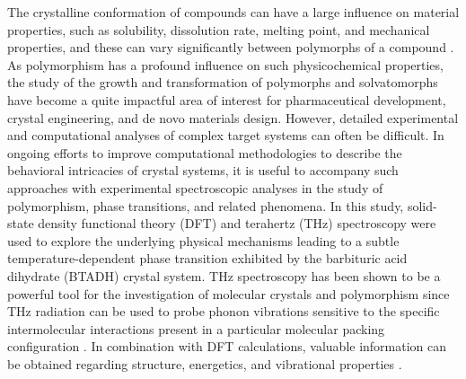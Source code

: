 The crystalline conformation of compounds can have a large influence on material properties, such as solubility, dissolution rate, melting point, and mechanical properties, and these can vary significantly between polymorphs of a compound \citep{Brittain2016,bernstein_polymorphism_2011,gentili_polymorphism_2019}. As polymorphism has a profound influence on such physicochemical properties, the study of the growth and transformation of polymorphs and solvatomorphs have become a quite impactful area of interest for pharmaceutical development, crystal engineering, and de novo materials design\citep{galindo_control_2017,maini_chemical_2015,hiremath_controlling_2005,cocca_influence_2011,lee_crystal_2011,moulton_molecules_2001,baskar_raj_pseudo-polymorphism_2003}. However, detailed experimental and computational analyses of complex target systems can often be difficult. In ongoing efforts to improve computational methodologies to describe the behavioral intricacies of crystal systems, it is useful to accompany such approaches with experimental spectroscopic analyses in the study of polymorphism, phase transitions, and related phenomena.
In this study, solid-state density functional theory (DFT) and terahertz (THz) spectroscopy were used to explore the underlying physical mechanisms leading to a subtle temperature-dependent phase transition exhibited by the barbituric acid dihydrate (BTADH) crystal system. THz spectroscopy has been shown to be a powerful tool for the investigation of molecular crystals and polymorphism since THz radiation can be used to probe phonon vibrations sensitive to the specific intermolecular interactions present in a particular molecular packing configuration \citep{ruggiero_resolving_2016,ruggiero_predicting_2018,king_understanding_2011,king_identification_2011,delaney_understanding_2012}. In combination with DFT calculations, valuable information can be obtained regarding structure, energetics, and vibrational properties \citep{ruggiero_concomitant_2017,allis_solid-state_2006}. 
